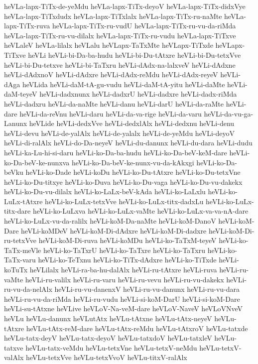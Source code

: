 {heVLa-lapx-TiTx-de-yeMdu
heVLa-lapx-TiTx-deyoV
heVLa-lapx-TiTx-didxVye
heVLa-lapx-TiTxdudx
heVLa-lapx-TiTxlalx
heVLa-lapx-TiTx-ru-naMte
heVLa-lapx-TiTx-ruva
heVLa-lapx-TiTx-ru-vudU
heVLa-lapx-TiTx-ru-vu-da-riMda
heVLa-lapx-TiTx-ru-vu-dilalx
heVLa-lapx-TiTx-ru-vudu
heVLa-lapx-TiTxve
heVLaleV
heVLa-lilalx
heVLalu
heVLapx-TaTxMte
heVLapx-TiTxde
heVLapx-TiTxve
heVLi
heVLi-bi-Da-ba-hudu
heVLi-bi-Du-tAtxre
heVLi-bi-Du-tetxVve
heVLi-bi-Du-tetxve
heVLi-bi-TaTxru
heVLi-dAdx-na-lalxveV
heVLi-dAdxne
heVLi-dAdxnoV
heVLi-dAdxre
heVLi-dAdx-reMdu
heVLi-dAdx-reyeV
heVLi-dAga
heVLida
heVLi-daM-tA-gu-vudu
heVLi-daM-tA-yitu
heVLi-daMte
heVLi-daM-teyeV
heVLi-dadxnunx
heVLi-dadxrU
heVLi-dadxre
heVLi-dadx-riMda
heVLi-dadxru
heVLi-da-naMte
heVLi-danu
heVLi-darU
heVLi-da-raMte
heVLi-dare
heVLi-da-reVnu
heVLi-daru
heVLi-da-va-rige
heVLi-da-varu
heVLi-da-vu-ga-Lanunx
heVLide
heVLi-dedxVve
heVLi-dedxlAlx
heVLi-dedxnu
heVLi-denu
heVLi-devu
heVLi-de-yalAlx
heVLi-de-yalalx
heVLi-de-yeMdu
heVLi-deyoV
heVLi-di-ralAlx
heVLi-do-Da-neyeV
heVLi-du-danunx
heVLi-du-dara
heVLi-dudu
heVLi-ka-Lu-hi-si-daru
heVLi-ko-Da-ba-hudu
heVLi-ko-Da-beV-keM-dare
heVLi-ko-Da-beV-ke-nunxva
heVLi-ko-Da-beV-ke-nunx-vu-da-kAkxgi
heVLi-ko-Da-beVku
heVLi-ko-Dade
heVLi-koDu
heVLi-ko-Du-tAtxre
heVLi-ko-Du-tetxVne
heVLi-ko-Du-titxye
heVLi-ko-Duva
heVLi-ko-Du-vaga
heVLi-ko-Du-vu-dakekx
heVLi-ko-Du-vu-dilalx
heVLi-ko-LaLx-beV-kAda
heVLi-ko-LaLxlu
heVLi-ko-LuLx-tAtxre
heVLi-ko-LuLx-tetxVve
heVLi-ko-LuLx-titx-dadxLu
heVLi-ko-LuLx-titx-dare
heVLi-ko-LuLxva
heVLi-ko-LuLx-vaMte
heVLi-ko-LuLx-va-va-nA-dare
heVLi-ko-LuLx-vu-da-ralilx
heVLi-koM-Da-naMte
heVLi-koM-DanoV
heVLi-koM-Dare
heVLi-koMDeV
heVLi-koM-Di-dAdxre
heVLi-koM-Di-dadxre
heVLi-koM-Di-ru-tetxVve
heVLi-koM-Di-ruva
heVLi-koMDu
heVLi-ko-TaTxM-teyeV
heVLi-ko-TaTx-meVle
heVLi-ko-TaTxrU
heVLi-ko-TaTxre
heVLi-ko-TaTxru
heVLi-ko-TaTx-varu
heVLi-ko-TeTxnu
heVLi-ko-TiTx-dAdxre
heVLi-ko-TiTxde
heVLi-koTuTx
heVLilalx
heVLi-ra-ba-hu-dalAlx
heVLi-ru-tAtxre
heVLi-ruva
heVLi-ru-vaMte
heVLi-ru-valilx
heVLi-ru-varu
heVLi-ru-vevu
heVLi-ru-vu-dakekx
heVLi-ru-vu-da-nelAlx
heVLi-ru-vu-danenxV
heVLi-ru-vu-danunx
heVLi-ru-vu-dara
heVLi-ru-vu-da-riMda
heVLi-ru-vudu
heVLi-si-koM-DarU
heVLi-si-koM-Dare
heVLi-su-tAtxne
heVLive
heVLoV-Na-veM-dare
heVLoV-NaveV
heVLoVNveV
heVLu
heVLu-danunx
heVLutAtx
heVLu-tAtxne
heVLu-tAtx-neyeV
heVLu-tAtxre
heVLu-tAtx-reM-dare
heVLu-tAtx-reMdu
heVLu-tAtxroV
heVLu-tatxde
heVLu-tatx-deyV
heVLu-tatx-deyoV
heVLu-tatxdoV
heVLu-tatxleV
heVLu-tatxve
heVLu-tatx-veMdu
heVLu-tetxVne
heVLu-tetxV-neMdu
heVLu-tetxV-valAlx
heVLu-tetxVve
heVLu-tetxVvoV
heVLu-titxV-ralAlx
}
